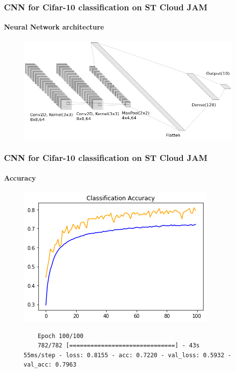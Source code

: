 \documentclass{beamer}
\begin{document}
\begin{frame}[fragile]
\frametitle{CNN for Cifar-10 classification on ST Cloud JAM}
\framesubtitle{Neural Network architecture}
\begin{figure}
	\centering
	\includegraphics[scale=0.4]{pictures/Cifar_10_lite/cnn3}
\end{figure}
\end{frame}

\begin{frame}[fragile]
\frametitle{CNN for Cifar-10 classification on ST Cloud JAM}
\framesubtitle{Accuracy}
\begin{figure}[ht]
	\centering
	\includegraphics[scale=0.5]{pictures/Accuracy_plot_Cifar10_Keras_Lite}
	\begin{lstlisting}
	Epoch 100/100
	782/782 [==============================] - 43s 55ms/step - loss: 0.8155 - acc: 0.7220 - val_loss: 0.5932 - val_acc: 0.7963
	\end{lstlisting}
\end{figure}
\end{frame}
\end{document}

